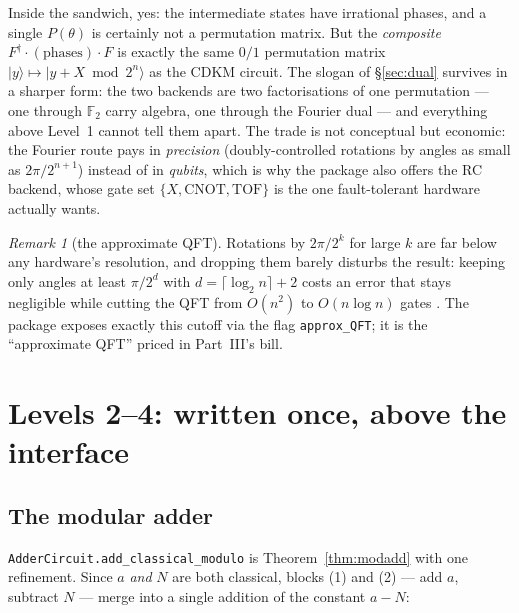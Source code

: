 \documentclass[11pt]{article}
\renewcommand{\ket}[1]{\lvert #1 \rangle}
\newcommand{\TOF}{\mathrm{TOF}}
\newcommand{\CNOT}{\mathrm{CNOT}}
\newcommand{\code}[1]{\texttt{#1}}
\theoremstyle{plain}
\theoremstyle{remark}
\newtheorem*{remark}{Remark}
\begin{document}
\begin{keybox}[title={Doesn't this break ``no complex number below Level 5''?}]
Inside the sandwich, yes: the intermediate states have irrational phases, and a single $P(\theta)$
is certainly not a permutation matrix. But the \emph{composite}
$F^\dagger\cdot(\text{phases})\cdot F$ is exactly the same $0/1$ permutation matrix
$\ket y\mapsto\ket{y+X\bmod2^n}$ as the CDKM circuit. The slogan of \S\ref{sec:dual} survives in a
sharper form: the two backends are two factorisations of one permutation --- one through
$\mathbb F_2$ carry algebra, one through the Fourier dual --- and everything above Level~1 cannot
tell them apart. The trade is not conceptual but economic: the Fourier route pays in
\emph{precision} (doubly-controlled rotations by angles as small as $2\pi/2^{n+1}$) instead of in
\emph{qubits}, which is why the package also offers the RC backend, whose gate set
$\{X,\CNOT,\TOF\}$ is the one fault-tolerant hardware actually wants.
\end{keybox}

\begin{remark}[the approximate QFT]
Rotations by $2\pi/2^k$ for large $k$ are far below any hardware's resolution, and dropping them
barely disturbs the result: keeping only angles at least $\pi/2^{d}$ with
$d=\lceil\log_2n\rceil+2$ costs an error that stays negligible while cutting the QFT from $O(n^2)$
to $O(n\log n)$ gates \cite{barenco-aqft,cheung}. The package exposes exactly this cutoff via the
flag \code{approx\_QFT}; it is the ``approximate QFT'' priced in Part~III's bill.
\end{remark}

\section{Levels 2--4: written once, above the interface}\label{sec:code-l2}

\subsection{The modular adder}

\code{AdderCircuit.add\_classical\_modulo} is Theorem~\ref{thm:modadd} with one refinement. Since
$a$ \emph{and} $N$ are both classical, blocks (1) and (2) --- add $a$, subtract $N$ --- merge into
a single addition of the constant $a-N$:
\end{document}
